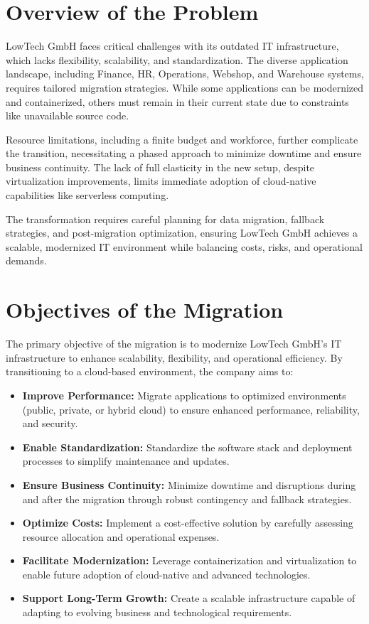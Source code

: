 \documentclass{llncs}
\begin{document}
\section{Overview of the Problem}
LowTech GmbH faces critical challenges with its outdated IT infrastructure, which lacks flexibility, scalability, and standardization.
The diverse application landscape, including Finance, HR, Operations, Webshop, and Warehouse systems,
requires tailored migration strategies. While some applications can be modernized and containerized,
others must remain in their current state due to constraints like unavailable source code.

Resource limitations, including a finite budget and workforce, further complicate the transition, necessitating
a phased approach to minimize downtime and ensure business continuity.
The lack of full elasticity in the new setup, despite virtualization improvements, limits immediate adoption
of cloud-native capabilities like serverless computing.

The transformation requires careful planning for data migration, fallback strategies,
and post-migration optimization, ensuring LowTech GmbH achieves a scalable,
modernized IT environment while balancing costs, risks, and operational demands.


\section{Objectives of the Migration}

The primary objective of the migration is to modernize LowTech GmbH's IT infrastructure to enhance scalability, flexibility, and operational efficiency. By transitioning to a cloud-based environment, the company aims to:

\begin{itemize}
    \item \textbf{Improve Performance:} Migrate applications to optimized environments (public, private, or hybrid cloud) to ensure enhanced performance, reliability, and security.
    \item \textbf{Enable Standardization:} Standardize the software stack and deployment processes to simplify maintenance and updates.
    \item \textbf{Ensure Business Continuity:} Minimize downtime and disruptions during and after the migration through robust contingency and fallback strategies.
    \item \textbf{Optimize Costs:} Implement a cost-effective solution by carefully assessing resource allocation and operational expenses.
    \item \textbf{Facilitate Modernization:} Leverage containerization and virtualization to enable future adoption of cloud-native and advanced technologies.
    \item \textbf{Support Long-Term Growth:} Create a scalable infrastructure capable of adapting to evolving business and technological requirements.
\end{itemize}
\end{document}
